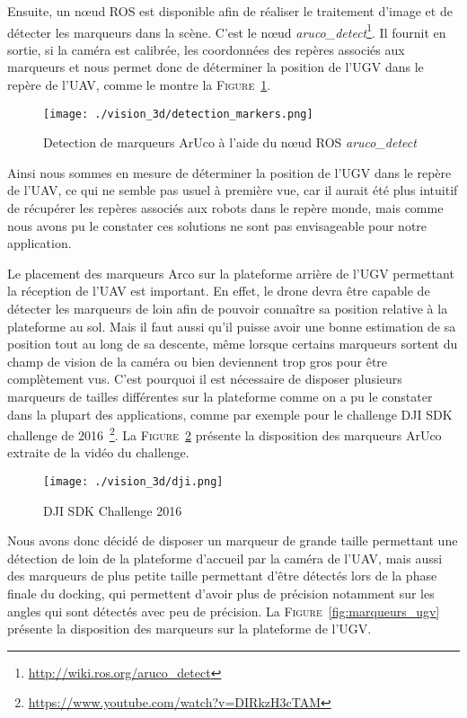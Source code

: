     Ensuite, un nœud ROS est disponible afin de réaliser le traitement d’image et de détecter les marqueurs dans la scène. C'est le nœud \textit{aruco\_detect}\footnote{\url{http://wiki.ros.org/aruco_detect}}. Il fournit en sortie, si la caméra est calibrée, les coordonnées des repères associés aux marqueurs et nous permet donc de déterminer la position de l’UGV dans le repère de l’UAV, comme le montre la \textsc{Figure}~\ref{fig:detection}.

    \begin{figure}[!htb]
        \centering
        \texttt{[image: ./vision\_3d/detection\_markers.png]}
        \caption{Detection de marqueurs ArUco à l'aide du n\oe ud ROS \textit{aruco\_detect}}
        \label{fig:detection}
    \end{figure}

    Ainsi nous sommes en mesure de déterminer la position de l’UGV dans le repère de l’UAV, ce qui ne semble pas usuel à première vue, car il aurait été plus intuitif de récupérer les repères associés aux robots dans le repère monde, mais comme nous avons pu le constater ces solutions ne sont pas envisageable pour notre application.

    Le placement des marqueurs Arco sur la plateforme arrière de l’UGV permettant la réception de l’UAV est important. En effet, le drone devra être capable de détecter les marqueurs de loin afin de pouvoir connaître sa position relative à la plateforme au sol. Mais il faut aussi qu’il puisse avoir une bonne estimation de sa position tout au long de sa descente, même lorsque certains marqueurs sortent du champ de vision de la caméra ou bien deviennent trop gros pour être complètement vus. C’est pourquoi il est nécessaire de disposer plusieurs marqueurs de tailles différentes sur la plateforme comme on a pu le constater dans la plupart des applications, comme par exemple pour le challenge DJI SDK challenge de 2016~\footnote{\url{https://www.youtube.com/watch?v=DIRkzH3cTAM}}. La \textsc{Figure}~\ref{fig:dji} présente la disposition des marqueurs ArUco extraite de la vidéo du challenge.

    \begin{figure}[!htb]
        \centering
        \texttt{[image: ./vision\_3d/dji.png]}
        \caption{DJI SDK Challenge 2016}
        \label{fig:dji}
    \end{figure}

    Nous avons donc décidé de disposer un marqueur de grande taille permettant une détection de loin de la plateforme d’accueil par la caméra de l’UAV, mais aussi des marqueurs de plus petite taille permettant d’être détectés lors de la phase finale du docking, qui permettent d’avoir plus de précision notamment sur les angles qui sont détectés avec peu de précision. La \textsc{Figure}~\ref{fig:marqueurs_ugv} présente la disposition des marqueurs sur la plateforme de l'UGV.
    
